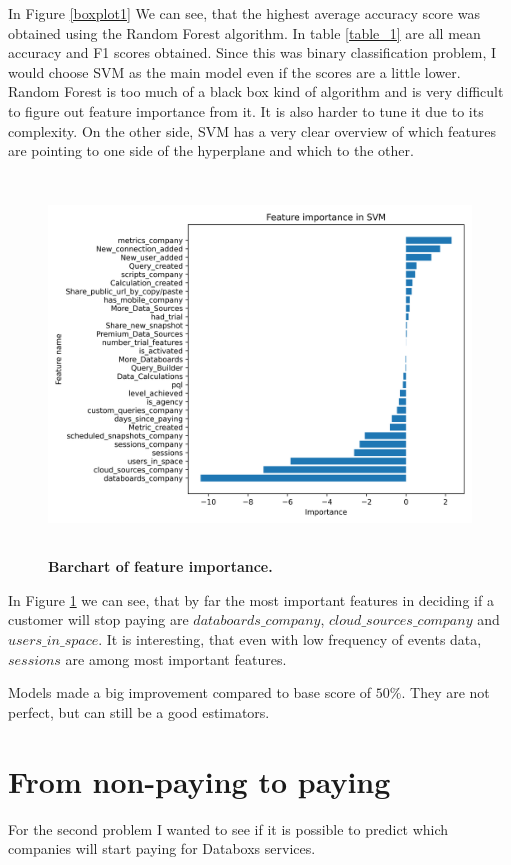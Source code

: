 \documentclass[fleqn,moreauthors,10pt]{ds_report}
\begin{document}
In Figure \ref{boxplot1} We can see, that the highest average accuracy score was obtained using the Random Forest algorithm. In table \ref{table_1} are all mean accuracy and F1 scores obtained. Since this was binary classification problem, I would choose SVM as the main model even if the scores are a little lower. Random Forest is too much of a black box kind of algorithm and is very difficult to figure out feature importance from it. It is also harder to tune it due to its complexity.  On the other side, SVM has a very clear overview of which features are pointing to one side of the hyperplane and which to the other.

\begin{figure}[h]\centering
	\includegraphics[width=\linewidth, height=10cm]{SVM_feature_imp.png}
	
	\caption{\textbf{Barchart of feature importance.}}
	\label{feature_importance_1}
\end{figure}

In Figure \ref{feature_importance_1} we can see, that by far the most important features in deciding if a customer will stop paying are $databoards\_company$, $cloud\_sources\_company$ and $users\_in\_space$. It is interesting, that even with low frequency of events data, $sessions$ are among most important features.

Models made a big improvement compared to base score of $50\%$. They are not perfect, but can still be a good estimators. 


\section{From non-paying to paying}
For the second problem I wanted to see if it is possible to predict which companies will start paying for Databoxs services. 
\end{document}
